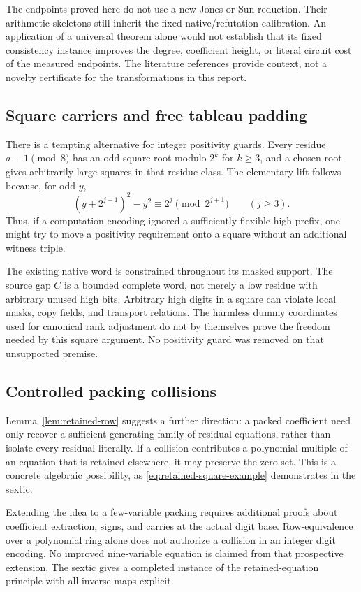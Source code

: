 \documentclass[11pt,a4paper]{article}
\theoremstyle{definition}
\begin{document}
The endpoints proved here do not use a new Jones or Sun reduction.
Their arithmetic skeletons still inherit the fixed native/refutation
calibration.  An application of a universal theorem alone would not
establish that its fixed consistency instance improves the degree,
coefficient height, or literal circuit cost of the measured endpoints.
The literature references provide context, not a novelty certificate
for the transformations in this report.

\subsection{Square carriers and free tableau padding}

There is a tempting alternative for integer positivity guards.
Every residue \(a\equiv1\pmod8\) has an odd square root modulo \(2^k\)
for \(k\ge3\), and a chosen root gives arbitrarily large squares in
that residue class.  The elementary lift follows because, for odd \(y\),
\[
 (y+2^{j-1})^2-y^2\equiv2^j\pmod{2^{j+1}}
 \qquad(j\ge3).
\]
Thus, if a computation encoding ignored a sufficiently flexible high
prefix, one might try to move a positivity requirement onto a square
without an additional witness triple.

The existing native word is constrained throughout its masked support.
The source gap \(C\) is a bounded complete word, not merely a low
residue with arbitrary unused high bits.  Arbitrary high digits in a
square can violate local masks, copy fields, and transport relations.
The harmless dummy coordinates used for canonical rank adjustment do
not by themselves prove the freedom needed by this square argument.
No positivity guard was removed on that unsupported premise.

\subsection{Controlled packing collisions}

Lemma~\ref{lem:retained-row} suggests a further direction: a packed
coefficient need only recover a sufficient generating family of
residual equations, rather than isolate every residual literally.
If a collision contributes a polynomial multiple of an equation that
is retained elsewhere, it may preserve the zero set.  This is a
concrete algebraic possibility, as \eqref{eq:retained-square-example}
demonstrates in the sextic.

Extending the idea to a few-variable packing requires additional
proofs about coefficient extraction, signs, and carries at the actual
digit base.  Row-equivalence over a polynomial ring alone does not
authorize a collision in an integer digit encoding.  No improved
nine-variable equation is claimed from that prospective extension.
The sextic gives a completed instance of the retained-equation
principle with all inverse maps explicit.
\end{document}
